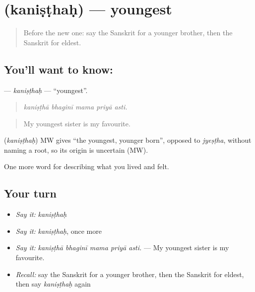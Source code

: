 \section[\texorpdfstring{\sk{कनिष्ठः} (kaniṣṭhaḥ)}{कनिष्ठः (kaniṣṭhaḥ)}]{ (kaniṣṭhaḥ) — youngest}

\label{lesson:SA-C498-kanisthah}



\begin{quote}
Before the new one: say the Sanskrit for a younger brother, then the Sanskrit for eldest.
\end{quote}

\subsection*{You'll want to know: }
\textbf{} — \emph{kaniṣṭhaḥ} — \textquotedblleft{}youngest\textquotedblright{}.

\begin{quote}
    
\end{quote}

\begin{quote}
\emph{kaniṣṭhā bhaginī mama priyā asti.}
\end{quote}

\begin{quote}
My youngest sister is my favourite.
\end{quote}

\begin{cousinweb}
\textbf{} (\emph{kaniṣṭhaḥ}) MW gives \textquotedblleft{}the youngest, younger born\textquotedblright{}, opposed to \emph{jyeṣṭha}, without naming a root, so its origin is uncertain (MW).
\end{cousinweb}

\begin{grammarlens}[title={What you've built}]
One more word for describing what you lived and felt.
\end{grammarlens}

\subsection*{Your turn}
\begin{itemize}
\raggedright
  \item \emph{Say it:} \emph{kaniṣṭhaḥ}
  \item \emph{Say it:} \emph{kaniṣṭhaḥ}, once more
  \item \emph{Say it:} \emph{kaniṣṭhā bhaginī mama priyā asti.} — My youngest sister is my favourite.
  \item \emph{Recall:} say the Sanskrit for a younger brother, then the Sanskrit for eldest, then say \emph{kaniṣṭhaḥ} again
\end{itemize}

